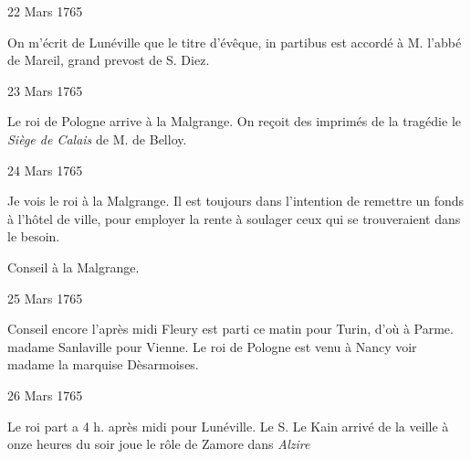                      \begin{diary}{22 Mars 1765}{}


                           On m'écrit de Lunéville que
                           le titre d'évêque,
                           in partibus est accordé à M.
                              l'abbé de Mareil,
                           grand prevost de S. Diez. \bigskip


                     \end{diary}

                     \begin{diary}{23 Mars 1765}{}


                           Le roi de Pologne arrive à la Malgrange.
                           On reçoit des
                           imprimés de la tragédie le \emph{Siège de
                                 Calais} de
                           M. de
                              Belloy. \bigskip


                     \end{diary}

                     \begin{diary}{24 Mars 1765}{}

                         Je vois le roi à la
                              Malgrange. Il est toujours
                           dans l'intention de remettre un fonds à l'hôtel
                              de ville, pour employer la rente à soulager ceux
                           qui se trouveraient dans le besoin. \bigskip


                         Conseil à la Malgrange. \bigskip


                     \end{diary}

                     \begin{diary}{25 Mars 1765}{}

                         Conseil encore l'après midi
                           Fleury est parti ce matin pour
                              Turin,
                           d'où à Parme. madame Sanlaville pour
                           Vienne. Le roi de Pologne est venu à Nancy
                           voir madame la marquise Dèsarmoises. \bigskip


                     \end{diary}

                     \begin{diary}{26 Mars 1765}{}


                           Le roi part a 4 h. après midi
                           pour Lunéville.
                           Le S. Le Kain arrivé de la veille
                           à onze heures
                           du soir joue le rôle de Zamore dans \emph{Alzire}
                        \bigskip


                     \end{diary}

